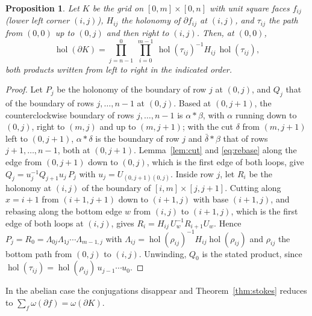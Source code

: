 \documentclass[11pt,reqno]{amsart}
\newtheorem{proposition}[theorem]{Proposition}
\theoremstyle{definition}
\theoremstyle{remark}
\numberwithin{equation}{section}
\newcommand{\hol}{\operatorname{hol}}
\begin{document}
\begin{proposition}\label{prop:grid}
Let $K$ be the grid on $[0,m]\times[0,n]$ with unit square faces $f_{ij}$ (lower left corner $(i,j)$), $H_{ij}$ the
holonomy of $\partial f_{ij}$ at $(i,j)$, and $\tau_{ij}$ the path from $(0,0)$ up to $(0,j)$ and then right to $(i,j)$.
Then, at $(0,0)$,
\[
\hol(\partial K)=\prod_{j=n-1}^{0}\ \prod_{i=0}^{m-1}\ \hol(\tau_{ij})^{-1}H_{ij}\,\hol(\tau_{ij}),
\]
both products written from left to right in the indicated order.
\end{proposition}
\begin{proof}
Let $P_j$ be the holonomy of the boundary of row $j$ at $(0,j)$, and $Q_j$ that of the boundary of rows
$j,\dots,n-1$ at $(0,j)$.  Based at $(0,j+1)$, the counterclockwise boundary of rows $j,\dots,n-1$ is $\alpha*\beta$, with
$\alpha$ running down to $(0,j)$, right to $(m,j)$ and up to $(m,j+1)$; with the cut $\delta$ from $(m,j+1)$ left to
$(0,j+1)$, $\alpha*\delta$ is the boundary of row $j$ and $\bar\delta*\beta$ that of rows $j+1,\dots,n-1$, both at $(0,j+1)$.
Lemma~\ref{lem:cut} and \eqref{eq:rebase} along the edge from $(0,j+1)$ down to $(0,j)$, which is the first edge of
both loops, give $Q_j=u_j^{-1}Q_{j+1}u_j\,P_j$ with $u_j=U_{(0,j+1)(0,j)}$.  Inside row $j$, let $R_i$ be the holonomy
at $(i,j)$ of the boundary of $[i,m]\times[j,j+1]$.  Cutting along $x=i+1$ from $(i+1,j+1)$ down to $(i+1,j)$ with
base $(i+1,j)$, and rebasing along the bottom edge $w$ from $(i,j)$ to $(i+1,j)$, which is the first edge of both
loops at $(i,j)$, gives $R_i=H_{ij}\,U_w^{-1}R_{i+1}U_w$.  Hence $P_j=R_0=\Lambda_{0j}\Lambda_{1j}\cdots\Lambda_{m-1,j}$ with
$\Lambda_{ij}=\hol(\rho_{ij})^{-1}H_{ij}\hol(\rho_{ij})$ and $\rho_{ij}$ the bottom path from $(0,j)$ to $(i,j)$.
Unwinding, $Q_0$ is the stated product, since $\hol(\tau_{ij})=\hol(\rho_{ij})\,u_{j-1}\cdots u_0$.
\end{proof}

In the abelian case the conjugations disappear and Theorem~\ref{thm:stokes} reduces to
$\sum_f\omega(\partial f)=\omega(\partial K)$.
\end{document}
